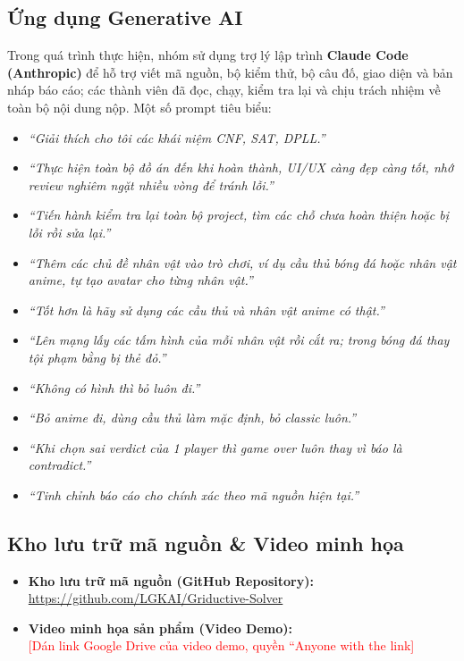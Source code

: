 \documentclass{article}
\begin{document}
\subsection{Ứng dụng Generative AI}
Trong quá trình thực hiện, nhóm sử dụng trợ lý lập trình \textbf{Claude Code (Anthropic)} để hỗ trợ viết mã nguồn, bộ kiểm thử, bộ câu đố, giao diện và bản nháp báo cáo; các thành viên đã đọc, chạy, kiểm tra lại và chịu trách nhiệm về toàn bộ nội dung nộp. Một số prompt tiêu biểu:
\begin{itemize}[noitemsep]
    \item \textit{``Giải thích cho tôi các khái niệm CNF, SAT, DPLL.''}
    \item \textit{``Thực hiện toàn bộ đồ án đến khi hoàn thành, UI/UX càng đẹp càng tốt, nhớ review nghiêm ngặt nhiều vòng để tránh lỗi.''}
    \item \textit{``Tiến hành kiểm tra lại toàn bộ project, tìm các chỗ chưa hoàn thiện hoặc bị lỗi rồi sửa lại.''}
    \item \textit{``Thêm các chủ đề nhân vật vào trò chơi, ví dụ cầu thủ bóng đá hoặc nhân vật anime, tự tạo avatar cho từng nhân vật.''}
    \item \textit{``Tốt hơn là hãy sử dụng các cầu thủ và nhân vật anime có thật.''}
    \item \textit{``Lên mạng lấy các tấm hình của mỗi nhân vật rồi cắt ra; trong bóng đá thay tội phạm bằng bị thẻ đỏ.''}
    \item \textit{``Không có hình thì bỏ luôn đi.''}
    \item \textit{``Bỏ anime đi, dùng cầu thủ làm mặc định, bỏ classic luôn.''}
    \item \textit{``Khi chọn sai verdict của 1 player thì game over luôn thay vì báo là contradict.''}
    \item \textit{``Tinh chỉnh báo cáo cho chính xác theo mã nguồn hiện tại.''}
\end{itemize}

\subsection{Kho lưu trữ mã nguồn \& Video minh họa}
\begin{itemize}
    \item \textbf{Kho lưu trữ mã nguồn (GitHub Repository):} \\
    \url{https://github.com/LGKAI/Griductive-Solver}

    \item \textbf{Video minh họa sản phẩm (Video Demo):} \\
    \textcolor{red}{[Dán link Google Drive của video demo, quyền ``Anyone with the link]}
\end{itemize}
\end{document}
